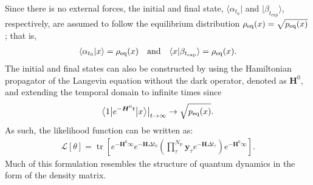 \documentclass[journal=jpcbfk,manuscript=article,layout=twocolumn,articletitle=true]{achemso}
\DeclareMathOperator*{\tr}{tr}
\begin{document}
Since there is no external forces, the initial and final state, $\langle \alpha_{t_0} |$ and $|\beta_{t_{\mathrm{exp}}} \rangle$, respectively, are assumed to follow the equilibrium distribution $\rho_{\rm{eq}}(x)=\sqrt{p_{\rm{eq}}(x)}$; that is,
\begin{align}
\label{eq:Start}
\langle \alpha_{t_0} | x \rangle = \rho_{\rm{eq}}(x) \quad {\rm and} \quad \langle x |\beta_{t_{\mathrm{exp}}} \rangle = \rho_{\rm{eq}}(x).
\end{align}
The initial and final states can also be constructed by using the Hamiltonian propagator of the Langevin equation without the dark operator, denoted as $\bm{H}^0$, and extending the temporal domain to infinite times since
\begin{align}
\big \langle 1 \big | e^{-\bm{H}^0 t } \big | x \big \rangle \big |_{{t \to \infty}} \rightarrow \sqrt{p_{\rm{eq}}(x)}.
\end{align}
As such, the likelihood function can be written as:
\begin{align}
\label{eq:Ltrace}
\mathcal{L}[\theta] = \tr \left[e^{-\bm{H}^0 \infty } e^{-\bm{H}\Delta t_0} \left( \prod_{\tau}^{N_{\mathrm{P}}} \bm{y}_{\tau}e^{-\bm{H}\Delta t_{\tau}} \right) e^{-\bm{H}^0 \infty } \right].
\end{align}
Much of this formulation resembles the structure of quantum dynamics in the form of the density matrix.\cite{Feynman:2012wb}   
\end{document}
